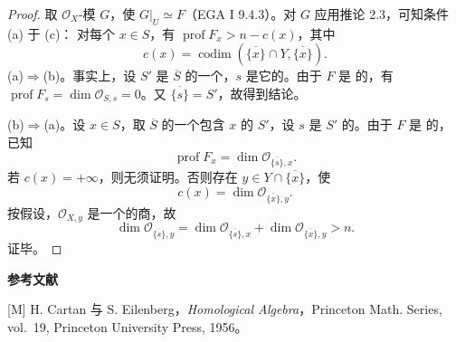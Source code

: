 \begin{proof}
取 $\mathscr O_X$-模 $G$，使 $G|_U\simeq F$（EGA I 9.4.3）。对 $G$ 应用推论 2.3，可知条件 (a) 于 (c)：
对每个 $x\in S$，有 $\operatorname{prof}F_x>n-c(x)$，其中
\[c(x)=\operatorname{codim}(\overline{\{x\}}\cap Y,\overline{\{x\}}).\]
(a)$\Rightarrow$(b)。事实上，设 $S'$ 是 $\overline S$ 的一个，$s$ 是它的。由于 $F$ 是  的，有 $\operatorname{prof}F_s=\dim\mathscr O_{S,s}=0$。又 $\overline{\{s\}}=S'$，故得到结论。

(b)$\Rightarrow$(a)。设 $x\in S$，取 $\overline S$ 的一个包含 $x$ 的 $S'$，设 $s$ 是 $S'$ 的。由于 $F$ 是  的，已知
\[\operatorname{prof}F_x=\dim\mathscr O_{\overline{\{s\}},x}.\]
若 $c(x)=+\infty$，则无须证明。否则存在 $y\in Y\cap\overline{\{x\}}$，使
\[c(x)=\dim\mathscr O_{\overline{\{x\}},y}.\]
按假设，$\mathscr O_{X,y}$ 是一个的商，故
\[\dim\mathscr O_{\overline{\{s\}},y}=\dim\mathscr O_{\overline{\{s\}},x}+\dim\mathscr O_{\overline{\{x\}},y}>n.\]
证毕。
\end{proof}
\textbf{参考文献}

[M] H. Cartan 与 S. Eilenberg，\emph{Homological Algebra}，Princeton Math. Series, vol.~19, Princeton University Press, 1956。
